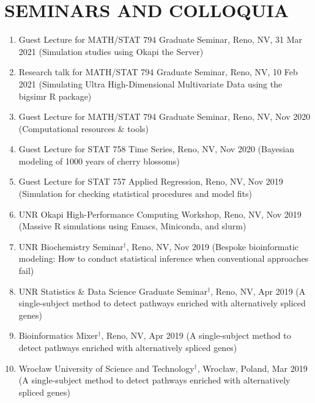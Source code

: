 \documentclass[paper=a4,fontsize=11pt]{scrartcl} %
\newcommand{\NewPart}[2]{\section*{\uppercase{#1} #2 }}
\newcommand{\TalkEntry}[4]{
		\noindent #1, #2, #3 #4}
\begin{document}
\NewPart{Seminars and Colloquia}{}

\vspace{-7pt}
\begin{enumerate}

\item\TalkEntry{Guest Lecture for MATH/STAT 794 Graduate Seminar}{Reno, NV}{31 Mar 2021}{(Simulation studies using Okapi the Server})

\item\TalkEntry{Research talk for MATH/STAT 794 Graduate Seminar}{Reno, NV}{10 Feb 2021}{(Simulating Ultra High-Dimensional Multivariate Data using the bigsimr R package})
  
\item\TalkEntry{Guest Lecture for MATH/STAT 794 Graduate Seminar}{Reno, NV}{Nov 2020}{(Computational resources \& tools})

\item\TalkEntry{Guest Lecture for STAT 758 Time Series}{Reno, NV}{Nov 2020}{(Bayesian modeling of 1000 years of cherry blossoms)}
  
\item\TalkEntry{Guest Lecture for STAT 757 Applied Regression}{Reno, NV}{Nov 2019}{(Simulation for checking statistical procedures and model fits)}
  
\item\TalkEntry{UNR Okapi High-Performance Computing Workshop}{Reno, NV}{Nov 2019}{(Massive R simulations using Emacs, Miniconda, and slurm)}
  
\item\TalkEntry{UNR Biochemistry Seminar$^{\dagger}$}{Reno, NV}{Nov 2019}{(Bespoke bioinformatic modeling: How to conduct statistical inference when conventional approaches fail)}
  
\item\TalkEntry{UNR Statistics \& Data Science Graduate Seminar$^{\dagger}$}{Reno, NV}{Apr 2019}{(A single-subject method to detect pathways enriched with alternatively spliced genes)}
  
\item\TalkEntry{Bioinformatics Mixer$^{\dagger}$}{Reno, NV}{Apr 2019}{(A single-subject method to detect pathways enriched with alternatively spliced genes)}

\item\TalkEntry{Wrocław University of Science and Technology$^{\dagger}$}{Wrocław, Poland}{Mar 2019}{(A single-subject method to detect pathways enriched with alternatively spliced genes)}


\end{enumerate}
\end{document}
